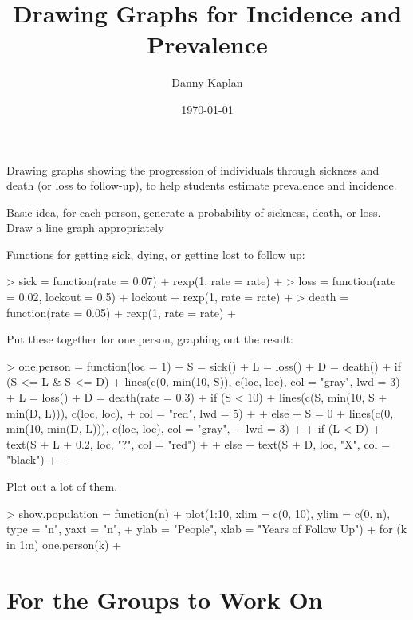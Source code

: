 \documentclass{article}
\title{Drawing Graphs for Incidence and Prevalence}
\author{Danny Kaplan}
\date{\today}
\begin{document}
\maketitle

Drawing graphs showing the progression of individuals through sickness
and death (or loss to follow-up), to help students estimate prevalence
and incidence.

Basic idea, for each person, generate a probability of sickness,
death, or loss.  Draw a line graph appropriately

Functions for getting sick, dying, or getting lost to follow up:
\begin{Schunk}
\begin{Sinput}
> sick = function(rate = 0.07) {
+     rexp(1, rate = rate)
+ }
> loss = function(rate = 0.02, lockout = 0.5) {
+     lockout + rexp(1, rate = rate)
+ }
> death = function(rate = 0.05) {
+     rexp(1, rate = rate)
+ }
\end{Sinput}
\end{Schunk}

Put these together for one person, graphing out the result:
\begin{Schunk}
\begin{Sinput}
> one.person = function(loc = 1) {
+     S = sick()
+     L = loss()
+     D = death()
+     if (S <= L & S <= D) {
+         lines(c(0, min(10, S)), c(loc, loc), col = "gray", lwd = 3)
+         L = loss()
+         D = death(rate = 0.3)
+         if (S < 10) 
+             lines(c(S, min(10, S + min(D, L))), c(loc, loc), 
+                 col = "red", lwd = 5)
+     }
+     else {
+         S = 0
+         lines(c(0, min(10, min(D, L))), c(loc, loc), col = "gray", 
+             lwd = 3)
+     }
+     if (L < D) {
+         text(S + L + 0.2, loc, "?", col = "red")
+     }
+     else {
+         text(S + D, loc, "X", col = "black")
+     }
+ }
\end{Sinput}
\end{Schunk}


Plot out a lot of them.
\begin{Schunk}
\begin{Sinput}
> show.population = function(n) {
+     plot(1:10, xlim = c(0, 10), ylim = c(0, n), type = "n", yaxt = "n", 
+         ylab = "People", xlab = "Years of Follow Up")
+     for (k in 1:n) one.person(k)
+ }
\end{Sinput}
\end{Schunk}

\section{For the Groups to Work On}
\end{document}

